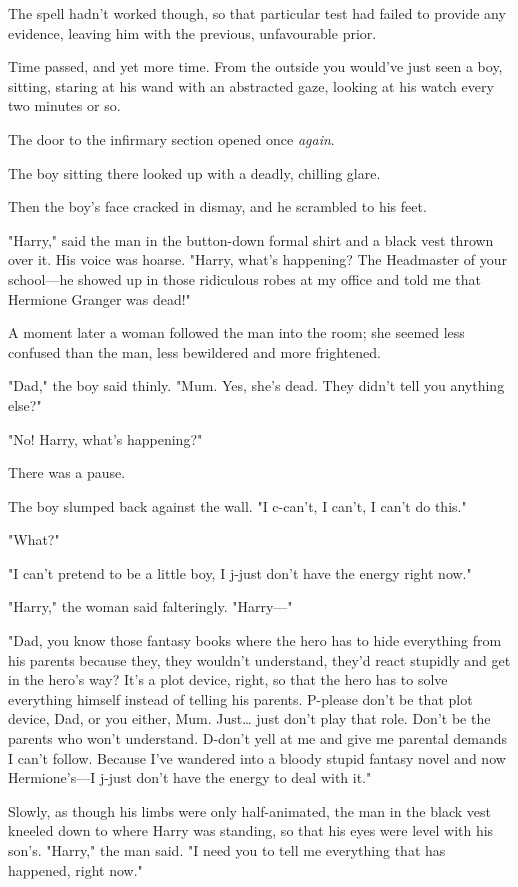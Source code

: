 The spell hadn't worked though, so that particular test had failed to provide
any evidence, leaving him with the previous, unfavourable prior.

Time passed, and yet more time. From the outside you would've just seen a boy,
sitting, staring at his wand with an abstracted gaze, looking at his watch
every two minutes or so.

The door to the infirmary section opened once \emph{again}.

The boy sitting there looked up with a deadly, chilling glare.

Then the boy's face cracked in dismay, and he scrambled to his feet.

"Harry," said the man in the button-down formal shirt and a black vest thrown
over it. His voice was hoarse. "Harry, what's happening? The Headmaster of your
school---he showed up in those ridiculous robes at my office and told me that
Hermione Granger was dead!"

A moment later a woman followed the man into the room; she seemed less confused
than the man, less bewildered and more frightened.

"Dad," the boy said thinly. "Mum. Yes, she's dead. They didn't tell you
anything else?"

"No! Harry, what's happening?"

There was a pause.

The boy slumped back against the wall. "I c-can't, I can't, I can't do this."

"What?"

"I can't pretend to be a little boy, I j-just don't have the energy right now."

"Harry," the woman said falteringly. "Harry---"

"Dad, you know those fantasy books where the hero has to hide everything from
his parents because they, they wouldn't understand, they'd react stupidly and
get in the hero's way? It's a plot device, right, so that the hero has to solve
everything himself instead of telling his parents. P-please don't be that plot
device, Dad, or you either, Mum. Just{\ldots} just don't play that role. Don't
be the parents who won't understand. D-don't yell at me and give me parental
demands I can't follow. Because I've wandered into a bloody stupid fantasy
novel and now Hermione's---I j-just don't have the energy to deal with it."

Slowly, as though his limbs were only half-animated, the man in the black vest
kneeled down to where Harry was standing, so that his eyes were level with his
son's. "Harry," the man said. "I need you to tell me everything that has
happened, right now."

